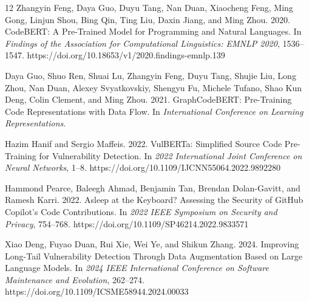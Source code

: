 \begin{thebibliography}{12}
Zhangyin Feng, Daya Guo, Duyu Tang, Nan Duan, Xiaocheng Feng, Ming Gong, Linjun Shou, Bing Qin, Ting Liu, Daxin Jiang, and Ming Zhou.
2020.
\newblock CodeBERT: A Pre-Trained Model for Programming and Natural Languages.
\newblock In \emph{Findings of the Association for Computational Linguistics: EMNLP 2020}, 1536--1547.
\newblock https://doi.org/10.18653/v1/2020.findings-emnlp.139

Daya Guo, Shuo Ren, Shuai Lu, Zhangyin Feng, Duyu Tang, Shujie Liu, Long Zhou, Nan Duan, Alexey Svyatkovskiy, Shengyu Fu, Michele Tufano, Shao Kun Deng, Colin Clement, and Ming Zhou.
2021.
\newblock GraphCodeBERT: Pre-Training Code Representations with Data Flow.
\newblock In \emph{International Conference on Learning Representations}.

Hazim Hanif and Sergio Maffeis.
2022.
\newblock VulBERTa: Simplified Source Code Pre-Training for Vulnerability Detection.
\newblock In \emph{2022 International Joint Conference on Neural Networks}, 1--8.
\newblock https://doi.org/10.1109/IJCNN55064.2022.9892280

Hammond Pearce, Baleegh Ahmad, Benjamin Tan, Brendan Dolan-Gavitt, and Ramesh Karri.
2022.
\newblock Asleep at the Keyboard? Assessing the Security of GitHub Copilot's Code Contributions.
\newblock In \emph{2022 IEEE Symposium on Security and Privacy}, 754--768.
\newblock https://doi.org/10.1109/SP46214.2022.9833571

Xiao Deng, Fuyao Duan, Rui Xie, Wei Ye, and Shikun Zhang.
2024.
\newblock Improving Long-Tail Vulnerability Detection Through Data Augmentation Based on Large Language Models.
\newblock In \emph{2024 IEEE International Conference on Software Maintenance and Evolution}, 262--274.
\newblock https://doi.org/10.1109/ICSME58944.2024.00033

\end{thebibliography}
